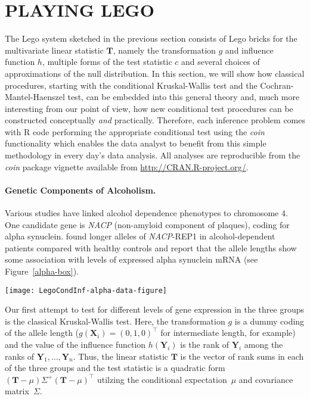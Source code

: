\documentclass{article}
\newcommand{\Rpackage}[1]{\textit{#1}}
\newcommand{\Robject}[1]{\texttt{#1}}
\newcommand{\RR}{\textsf{R}}
\newcommand{\X}{\mathbf{X}}
\newcommand{\Y}{\mathbf{Y}}
\newcommand{\T}{\mathbf{T}}
\begin{document}
\section{PLAYING LEGO \label{play}}

The Lego system sketched in the previous section consists of Lego bricks for 
the multivariate linear statistic $\T$, namely the transformation $g$ and
influence function $h$, multiple forms of the test statistic $c$ and several choices
of approximations of the null distribution. In this section, we will show how
classical procedures, starting with the conditional Kruskal-Wallis test and
the Cochran-Mantel-Haenszel test, can be embedded into this general theory
and, much more interesting from our point of view, how new conditional test
procedures can be constructed conceptually \textit{and} practically. 
Therefore, each inference problem comes with \RR{} code performing the
appropriate conditional test using the \Rpackage{coin} functionality 
which enables the data analyst to benefit from this
simple methodology in every day's data analysis. All analyses are
reproducible from the \Rpackage{coin} package vignette available from
\url{http://CRAN.R-project.org/}.

\paragraph{Genetic Components of Alcoholism.}

Various studies have linked alcohol dependence phenotypes to chromosome 4.  
One candidate gene is \textit{NACP} (non-amyloid component of plaques), 
coding for alpha synuclein. 
\cite{Boenscheta2005} found longer alleles of
\textit{NACP}-REP1 in alcohol-dependent patients compared with healthy controls
and report that the allele lengths show some
association with levels of expressed alpha synuclein mRNA (see
Figure~\ref{alpha-box}).

\begin{sidewaysfigure}
\begin{center}
\texttt{[image: LegoCondInf-alpha-data-figure]}
\caption{\Robject{alpha} data: Distribution of levels of expressed alpha synuclein mRNA
         in three groups defined by the \textit{NACP}-REP1 allele lengths.
         \label{alpha-box}}
\end{center}
\end{sidewaysfigure}
Our first attempt to test for different levels of gene expression in the three
groups is the classical Kruskal-Wallis test. Here, the transformation 
$g$ is a dummy coding of the allele length ($g(\X_i) = (0, 1, 0)^\top$ for
intermediate length, for example) and the value of the influence function 
$h(\Y_i)$ is the rank of $\Y_i$ among the ranks of $\Y_1, \dots, \Y_n$.
Thus, the linear statistic $\T$ is the vector of rank sums in each of the 
three groups and the test statistic is a quadratic form 
$(\T - \mu) \Sigma^+ (\T - \mu)^\top$ 
utilzing the conditional expectation~$\mu$ and covariance matrix~$\Sigma$.
\end{document}
